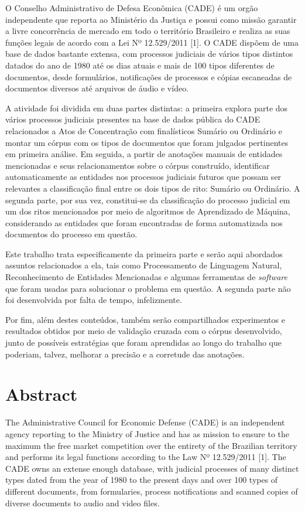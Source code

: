 \documentclass[11pt]{report}
\begin{document}
\indent\indent O Conselho Administrativo de Defesa Econômica (CADE) é um orgão independente que reporta ao Ministério da Justiça e possui como missão garantir a livre
concorrência de mercado em todo o território Brasileiro e realiza as suas funções legais de acordo com a Lei Nº 12.529/2011 [1].
O CADE dispõem de uma base de dados bastante extensa, com processos judiciais de vários tipos distintos datados do ano de 1980 até os dias atuais e mais de 100 tipos diferentes de
documentos, desde formulários, notificações de processos e cópias escaneadas de documentos diversos até arquivos de áudio e vídeo.

A atividade foi dividida em duas partes distintas: a primeira explora parte dos vários processos judiciais presentes na base de dados pública do CADE relacionados a Atos de
Concentração com finalísticos Sumário ou Ordinário e montar um córpus com os tipos de documentos que foram julgados pertinentes em primeira análise. Em seguida, a partir de anotações
manuais de entidades mencionadas e seus relacionamentos sobre o córpus construído, identificar automaticamente as entidades nos processos judiciais futuros que possam ser relevantes a classificação
final entre os dois tipos de rito: Sumário ou Ordinário. A segunda parte, por sua vez, constitui-se da classificação do processo judicial em um dos ritos mencionados por meio de
algoritmos de Aprendizado de Máquina, considerando as entidades que foram encontradas de forma automatizada nos documentos do processo em questão.

Este trabalho trata especificamente da primeira parte e serão aqui abordados assuntos relacionados a ela, tais como Processamento de Linguagem Natural, Reconhecimento de Entidades
Mencionadas e algumas ferramentas de \textit{software} que foram usadas para solucionar o problema em questão. A segunda parte não foi desenvolvida por falta de tempo, infelizmente.

Por fim, além destes conteúdos, também serão compartilhados experimentos e resultados obtidos por meio de validação cruzada com o córpus desenvolvido, junto de possíveis estratégias que
foram aprendidas ao longo do trabalho que poderiam, talvez, melhorar a precisão e a corretude das anotações.

\pagebreak
\thispagestyle{empty}
\chapter*{Abstract}

\indent\indent The Administrative Council for Economic Defense (CADE) is an independent agency reporting to the Ministry of Justice and has as mission to ensure to the maximum the free
market competition over the entirety of the Brazilian territory and performs its legal functions according to the Law Nº 12.529/2011 [1].
The CADE owns an extense enough database, with judicial processes of many distinct types dated from the year of 1980 to the present days and over 100 types of different documents,
from formularies, process notifications and scanned copies of diverse documents to audio and video files.
\end{document}

